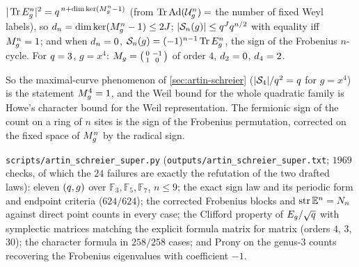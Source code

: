 \begin{corollary}
\label{cor:as-weil-bound-fixed-space}
$|\operatorname{Tr}E_g^n|^2 = q^{\,n+\dim\ker(M_{g}^n-1)}$ (from $\operatorname{Tr}\operatorname{Ad}(\mathcal U_{g}^n) =$ the number
of fixed Weyl labels), so $d_{n} = \dim\ker(M_{g}^n-1)\le2J$;
$|\mathcal S_{n}(g)|\le q^{J}q^{n/2}$ with equality iff $M_{g}^n = 1$; and when
$d_{n} = 0$, $\mathcal S_{n}(g) = (-1)^{n-1}\operatorname{Tr}E_g^n$, the sign of the Frobenius
$n$-cycle. For $q=3$, $g = x^4$: $M_{g} = \big(\begin{smallmatrix}0&-1\\1&0\end{smallmatrix}\big)$
of order $4$, $d_{2} = 0$, $d_{4} = 2$.
\end{corollary}

So the maximal-curve phenomenon of \cref{sec:artin-schreier} ($|\mathcal S_{4}|/q^2 = q$ for
$g = x^4$) is the statement $M_{g}^4 = 1$, and the Weil bound for the whole quadratic
family is Howe's character bound for the Weil representation. The fermionic sign of the
count on a ring of $n$ sites is the sign of the Frobenius permutation, corrected on the
fixed space of $M_{g}^n$ by the radical sign.

\begin{numerical}
\label{num:artin-schreier-super}
\texttt{scripts/artin\_schreier\_super.py} (\texttt{outputs/artin\_schreier\_super.txt};
$1969$ checks, of which the $24$ failures are exactly the refutation of the two drafted
laws): eleven $(q,g)$ over $\mathbb F_3,\mathbb F_5,\mathbb F_7$, $n\le9$; the exact sign
law and its periodic form and endpoint criteria ($624/624$); the corrected Frobenius
blocks and $\operatorname{str}\mathbb E^n = N_{n}$ against direct point counts in every case; the
Clifford property of $E_g/\sqrt{q}$ with symplectic matrices matching the explicit
formula matrix for matrix (orders $4$, $3$, $30$); the character formula in $258/258$
cases; and Prony on the genus-$3$ counts recovering the Frobenius eigenvalues with
coefficient $-1$.
\end{numerical}
